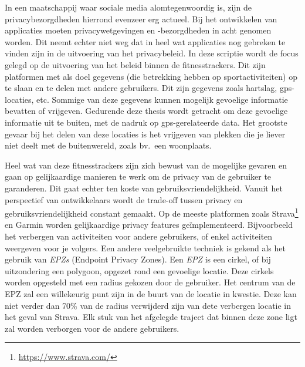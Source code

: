 In een maatschappij waar sociale media alomtegenwoordig is, zijn de
privacybezorgdheden hierrond evenzeer erg actueel. Bij het ontwikkelen van
applicaties moeten privacywetgevingen en -bezorgdheden in acht genomen worden.
Dit neemt echter niet weg dat in heel wat applicaties nog gebreken te vinden
zijn in de uitvoering van het privacybeleid. In deze scriptie wordt de focus
gelegd op de uitvoering van het beleid binnen de fitnesstrackers. Dit zijn
platformen met als doel gegevens (die betrekking hebben op sportactiviteiten)
op te slaan en te delen met andere gebruikers. Dit zijn gegevens zoals
hartslag, gps-locaties, etc. Sommige van deze gegevens kunnen mogelijk
gevoelige informatie bevatten of vrijgeven. Gedurende deze thesis wordt
getracht om deze gevoelige informatie uit te buiten, met de nadruk op
gps-gerelateerde data. Het grootste gevaar bij het delen van deze locaties is
het vrijgeven van plekken die je liever niet deelt met de buitenwereld, zoals
bv.\ een woonplaats.

Heel wat van deze fitnesstrackers zijn zich bewust van de mogelijke gevaren en
gaan op gelijkaardige manieren te werk om de privacy van de gebruiker te
garanderen. Dit gaat echter ten koste van gebruiksvriendelijkheid. Vanuit het
perspectief van ontwikkelaars wordt de trade-off tussen privacy en
gebruiksvriendelijkheid constant gemaakt. Op de meeste platformen zoals
Strava\footnote{\url{https://www.strava.com/}} en Garmin worden gelijkaardige
privacy features geïmplementeerd. Bijvoorbeeld het verbergen van activiteiten
voor andere gebruikers, of enkel activiteiten weergeven voor je volgers. Een
andere veelgebruikte techniek is gekend als het gebruik van \textit{EPZs}
(Endpoint Privacy Zones). Een \textit{EPZ} is een cirkel, of bij uitzondering
een polygoon, opgezet rond een gevoelige locatie. Deze cirkels worden opgesteld
met een radius gekozen door de gebruiker. Het centrum van de EPZ zal een
willekeurig punt zijn in de buurt van de locatie in kwestie. Deze kan niet
verder dan 70\% van de radius verwijderd zijn van dete verbergen locatie in het
geval van Strava. Elk stuk van het afgelegde traject dat binnen deze zone ligt
zal worden verborgen voor de andere gebruikers.

